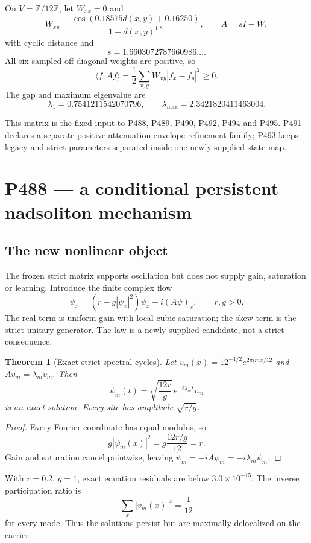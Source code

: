 \documentclass[11pt,a4paper]{article}
\newtheorem{theorem}{Theorem}[section]
\theoremstyle{definition}
\theoremstyle{remark}
\begin{document}
On $V=\mathbb Z/12\mathbb Z$, let $W_{xx}=0$ and
\[
W_{xy}=\frac{\cos(0.18575d(x,y)+0.16250)}{1+d(x,y)^{1.8}},
\qquad A=sI-W,
\]
with cyclic distance and
\[
s=1.6603072787660986\ldots.
\]
All six sampled off-diagonal weights are positive, so
\[
\langle f,Af\rangle=\frac12\sum_{x,y}W_{xy}|f_x-f_y|^2\ge0.
\]
The gap and maximum eigenvalue are
\[
\lambda_1=0.7541211542070796,
\qquad
\lambda_{\max}=2.3421820411463004.
\]

This matrix is the fixed input to P488, P489, P490, P492, P494 and P495. P491 declares a separate positive attenuation-envelope refinement family; P493 keeps legacy and strict parameters separated inside one newly supplied state map.

\section{P488 --- a conditional persistent nadsoliton mechanism}

\subsection{The new nonlinear object}

The frozen strict matrix supports oscillation but does not supply gain, saturation or learning. Introduce the finite complex flow
\[
\boxed{\dot\psi_x=(r-g|\psi_x|^2)\psi_x-i(A\psi)_x},
\qquad r,g>0.
\]
The real term is uniform gain with local cubic saturation; the skew term is the strict unitary generator. The law is a newly supplied candidate, not a strict consequence.

\begin{theorem}[Exact strict spectral cycles]
Let $v_m(x)=12^{-1/2}e^{2\pi imx/12}$ and $Av_m=\lambda_mv_m$. Then
\[
\psi_m(t)=\sqrt{\frac{12r}{g}}\,e^{-i\lambda_mt}v_m
\]
is an exact solution. Every site has amplitude $\sqrt{r/g}$.
\end{theorem}

\begin{proof}
Every Fourier coordinate has equal modulus, so
\[
g|\psi_m(x)|^2=g\frac{12r/g}{12}=r.
\]
Gain and saturation cancel pointwise, leaving
\(
\dot\psi_m=-iA\psi_m=-i\lambda_m\psi_m
\).
\end{proof}

With $r=0.2$, $g=1$, exact equation residuals are below $3.0\times10^{-15}$. The inverse participation ratio is
\[
\sum_x|v_m(x)|^4=\frac1{12}
\]
for every mode. Thus the solutions persist but are maximally delocalized on the carrier.
\end{document}
